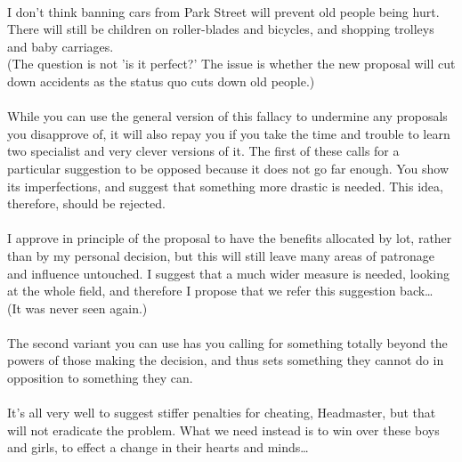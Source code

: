 \documentclass[a4paper,12pt,single,pdftex]{scrartcl}
\begin{document}
    
      
    \\

    
      I don't think banning cars from Park Street will prevent old people being hurt. There will still be children on roller-blades and bicycles, and shopping trolleys and baby carriages.
    \\

    
      (The question is not 'is it perfect?' The issue is whether the new proposal will cut down accidents as the status quo cuts down old people.)
    \\

    
      
    \\

    
      While you can use the general version of this fallacy to undermine any proposals you disapprove of, it will also repay you if you take the time and trouble to learn two specialist and very clever versions of it. The first of these calls for a particular suggestion to be opposed because it does not go far enough. You show its imperfections, and suggest that something more drastic is needed. This idea, therefore, should be rejected.
    \\

    
      
    \\

    
      I approve in principle of the proposal to have the benefits allocated by lot, rather than by my personal decision, but this will still leave many areas of patronage and influence untouched. I suggest that a much wider measure is needed, looking at the whole field, and therefore I propose that we refer this suggestion back…
    \\

    
      (It was never seen again.)
    \\

    
      
    \\

    
      The second variant you can use has you calling for something totally beyond the powers of those making the decision, and thus sets something they cannot do in opposition to something they can.
    \\

    
      
    \\

    
      It's all very well to suggest stiffer penalties for cheating, Headmaster, but that will not eradicate the problem. What we need instead is to win over these boys and girls, to effect a change in their hearts and minds…
    \\
\end{document}

